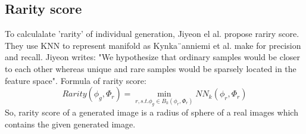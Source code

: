 \subsection{Rarity score}
To calculalate 'rarity' of individual generation, Jiyeon el al. propose rariry score. They use KNN to represent manifold as Kynka¨anniemi et al.\cite{Precision_recall} make for precision and recall. Jiyeon writes: "We hypothesize that ordinary samples would be closer to each other whereas unique and rare samples would be sparsely located in the feature space"\cite[p.4]{RarityScore}. Formula of rarity score:
\begin{equation}
Rarity(\phi_g,\Phi_r)=\min_{r, s.t. \phi_g\in B_k(\phi_r,\Phi_r)}NN_k(\phi_r,\Phi_r)
\end{equation}
So, rarity score of a generated image is a radius of sphere of a
real images which contains the given generated image.


